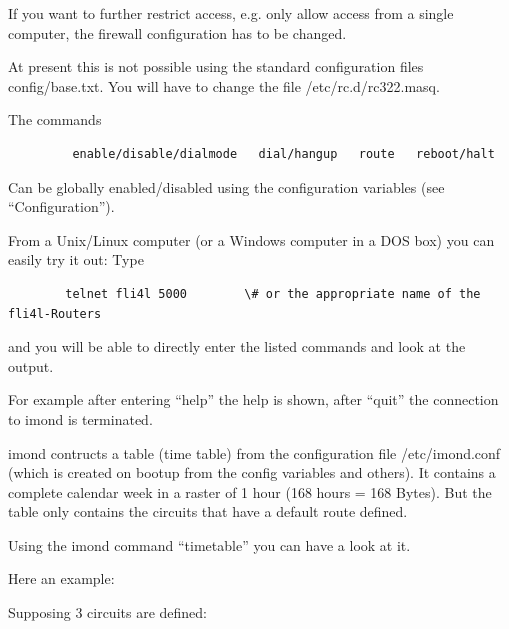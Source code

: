   If you want to further restrict access, e.g. only allow access
  from a single computer, the firewall configuration has to be changed.

  At present this is not possible using the standard configuration files
  config/base.txt. You will have to change the file /etc/rc.d/rc322.masq.

  The commands

\begin{example}
\begin{verbatim}
         enable/disable/dialmode   dial/hangup   route   reboot/halt
\end{verbatim}
\end{example}

  Can be globally enabled/disabled using the configuration variables
   (see ``Configuration'').

  From a Unix/Linux computer (or a Windows computer in a DOS box) you can
  easily try it out:
  Type

\begin{example}
\begin{verbatim}
        telnet fli4l 5000        \# or the appropriate name of the fli4l-Routers
\end{verbatim}
\end{example}

  and you will be able to directly enter the listed commands and look at
  the output.

  For example after entering ``help'' the help is shown, after
  ``quit'' the connection to imond is terminated.


  imond contructs a table (time table) from the configuration file
  /etc/imond.conf (which is created on bootup from the config variables
   and others). It contains a complete
  calendar week in a raster of 1 hour (168 hours = 168 Bytes). But the
  table only contains the circuits that have a default route defined.

  Using the imond command ``timetable'' you can have a look at it.

  Here an example:

  Supposing 3 circuits are defined:


